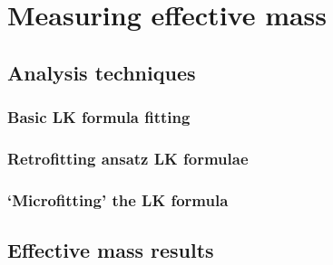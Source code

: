 
\section{Measuring effective mass}

\subsection{Analysis techniques}

\subsubsection{Basic LK formula fitting}

\subsubsection{Retrofitting ansatz LK formulae}

\subsubsection{`Microfitting' the LK formula}

\subsection{Effective mass results}


